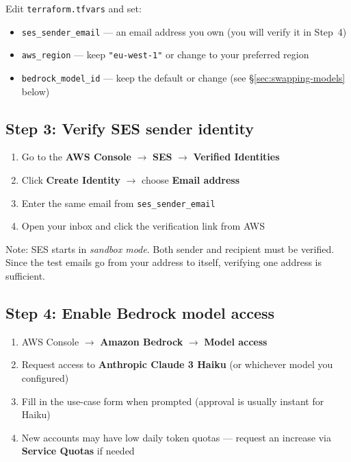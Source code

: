 \documentclass[11pt,a4paper]{article}
\begin{document}
Edit \texttt{terraform.tfvars} and set:
\begin{itemize}[leftmargin=*]
  \item \texttt{ses\_sender\_email} --- an email address you own (you will verify it in Step~4)
  \item \texttt{aws\_region} --- keep \texttt{"eu-west-1"} or change to your preferred region
  \item \texttt{bedrock\_model\_id} --- keep the default or change (see \S{}\ref{sec:swapping-models} below)
\end{itemize}

\subsection{Step 3: Verify SES sender identity}

\begin{enumerate}[leftmargin=*]
  \item Go to the \textbf{AWS Console} $\to$ \textbf{SES} $\to$ \textbf{Verified Identities}
  \item Click \textbf{Create Identity} $\to$ choose \textbf{Email address}
  \item Enter the same email from \texttt{ses\_sender\_email}
  \item Open your inbox and click the verification link from AWS
\end{enumerate}

Note: SES starts in \emph{sandbox mode}. Both sender and recipient must be verified. Since the test emails go from your address to itself, verifying one address is sufficient.

\subsection{Step 4: Enable Bedrock model access}

\begin{enumerate}[leftmargin=*]
  \item AWS Console $\to$ \textbf{Amazon Bedrock} $\to$ \textbf{Model access}
  \item Request access to \textbf{Anthropic Claude 3 Haiku} (or whichever model you configured)
  \item Fill in the use-case form when prompted (approval is usually instant for Haiku)
  \item New accounts may have low daily token quotas --- request an increase via \textbf{Service Quotas} if needed
\end{enumerate}
\end{document}
